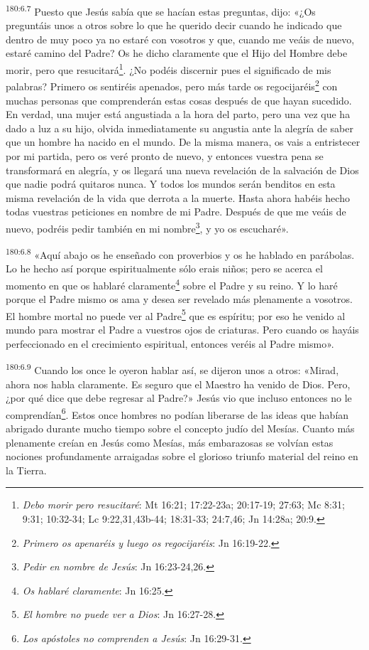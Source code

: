 \par
\textsuperscript{180:6.7} Puesto que Jesús sabía que se hacían estas preguntas, dijo: «¿Os preguntáis unos a otros sobre lo que he querido decir cuando he indicado que dentro de muy poco ya no estaré con vosotros y que, cuando me veáis de nuevo, estaré camino del Padre? Os he dicho claramente que el Hijo del Hombre debe morir, pero que resucitará\footnote{\textit{Debo morir pero resucitaré}: Mt 16:21; 17:22-23a; 20:17-19; 27:63; Mc 8:31; 9:31; 10:32-34; Lc 9:22,31,43b-44; 18:31-33; 24:7,46; Jn 14:28a; 20:9.}. ¿No podéis discernir pues el significado de mis palabras? Primero os sentiréis apenados, pero más tarde os regocijaréis\footnote{\textit{Primero os apenaréis y luego os regocijaréis}: Jn 16:19-22.} con muchas personas que comprenderán estas cosas después de que hayan sucedido. En verdad, una mujer está angustiada a la hora del parto, pero una vez que ha dado a luz a su hijo, olvida inmediatamente su angustia ante la alegría de saber que un hombre ha nacido en el mundo. De la misma manera, os vais a entristecer por mi partida, pero os veré pronto de nuevo, y entonces vuestra pena se transformará en alegría, y os llegará una nueva revelación de la salvación de Dios que nadie podrá quitaros nunca. Y todos los mundos serán benditos en esta misma revelación de la vida que derrota a la muerte. Hasta ahora habéis hecho todas vuestras peticiones en nombre de mi Padre. Después de que me veáis de nuevo, podréis pedir también en mi nombre\footnote{\textit{Pedir en nombre de Jesús}: Jn 16:23-24,26.}, y yo os escucharé».

\par
\textsuperscript{180:6.8} «Aquí abajo os he enseñado con proverbios y os he hablado en parábolas. Lo he hecho así porque espiritualmente sólo erais niños; pero se acerca el momento en que os hablaré claramente\footnote{\textit{Os hablaré claramente}: Jn 16:25.} sobre el Padre y su reino. Y lo haré porque el Padre mismo os ama y desea ser revelado más plenamente a vosotros. El hombre mortal no puede ver al Padre\footnote{\textit{El hombre no puede ver a Dios}: Jn 16:27-28.} que es espíritu; por eso he venido al mundo para mostrar el Padre a vuestros ojos de criaturas. Pero cuando os hayáis perfeccionado en el crecimiento espiritual, entonces veréis al Padre mismo».

\par
\textsuperscript{180:6.9} Cuando los once le oyeron hablar así, se dijeron unos a otros: «Mirad, ahora nos habla claramente. Es seguro que el Maestro ha venido de Dios. Pero, ¿por qué dice que debe regresar al Padre?» Jesús vio que incluso entonces no le comprendían\footnote{\textit{Los apóstoles no comprenden a Jesús}: Jn 16:29-31.}. Estos once hombres no podían liberarse de las ideas que habían abrigado durante mucho tiempo sobre el concepto judío del Mesías. Cuanto más plenamente creían en Jesús como Mesías, más embarazosas se volvían estas nociones profundamente arraigadas sobre el glorioso triunfo material del reino en la Tierra.